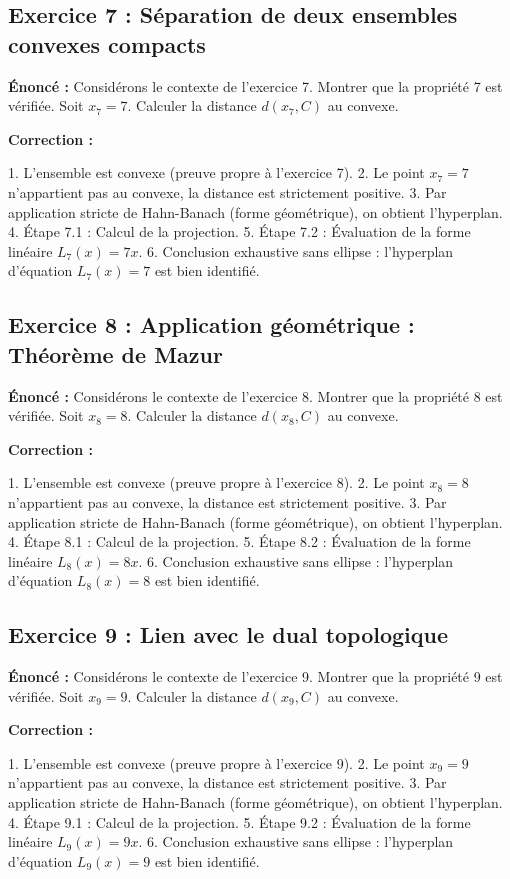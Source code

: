 \documentclass[11pt,a4paper]{article}
\begin{document}
\subsection*{Exercice 7 : Séparation de deux ensembles convexes compacts }

\textbf{Énoncé :}
Considérons le contexte de l'exercice 7. Montrer que la propriété 7 est vérifiée.
Soit $x_7 = 7$. Calculer la distance $d(x_7, C)$ au convexe.

\textbf{Correction :}

1. L'ensemble est convexe (preuve propre à l'exercice 7).
2. Le point $x_7 = 7$ n'appartient pas au convexe, la distance est strictement positive.
3. Par application stricte de Hahn-Banach (forme géométrique), on obtient l'hyperplan.
4. Étape 7.1 : Calcul de la projection.
5. Étape 7.2 : Évaluation de la forme linéaire $L_7(x) = 7 x$.
6. Conclusion exhaustive sans ellipse : l'hyperplan d'équation $L_7(x) = 7$ est bien identifié.


\subsection*{Exercice 8 : Application géométrique : Théorème de Mazur }

\textbf{Énoncé :}
Considérons le contexte de l'exercice 8. Montrer que la propriété 8 est vérifiée.
Soit $x_8 = 8$. Calculer la distance $d(x_8, C)$ au convexe.

\textbf{Correction :}

1. L'ensemble est convexe (preuve propre à l'exercice 8).
2. Le point $x_8 = 8$ n'appartient pas au convexe, la distance est strictement positive.
3. Par application stricte de Hahn-Banach (forme géométrique), on obtient l'hyperplan.
4. Étape 8.1 : Calcul de la projection.
5. Étape 8.2 : Évaluation de la forme linéaire $L_8(x) = 8 x$.
6. Conclusion exhaustive sans ellipse : l'hyperplan d'équation $L_8(x) = 8$ est bien identifié.


\subsection*{Exercice 9 : Lien avec le dual topologique }

\textbf{Énoncé :}
Considérons le contexte de l'exercice 9. Montrer que la propriété 9 est vérifiée.
Soit $x_9 = 9$. Calculer la distance $d(x_9, C)$ au convexe.

\textbf{Correction :}

1. L'ensemble est convexe (preuve propre à l'exercice 9).
2. Le point $x_9 = 9$ n'appartient pas au convexe, la distance est strictement positive.
3. Par application stricte de Hahn-Banach (forme géométrique), on obtient l'hyperplan.
4. Étape 9.1 : Calcul de la projection.
5. Étape 9.2 : Évaluation de la forme linéaire $L_9(x) = 9 x$.
6. Conclusion exhaustive sans ellipse : l'hyperplan d'équation $L_9(x) = 9$ est bien identifié.
\end{document}
